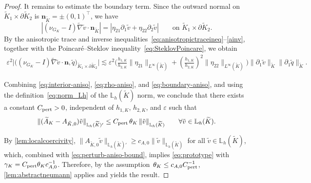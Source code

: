 \documentclass[a4paper,twoside,10pt]{article}
\newcommand{\AKO}{{A_{\tilde K,0}}}
\newcommand{\eps}{\varepsilon}
\newcommand{\IL}{\mathbb{L}}
\newcommand{\bn}{\mathbf{n}}
\numberwithin{equation}{section}
\newcommand{\Kt}{\widetilde{K}}
\newcommand{\hKot}{h_{1,K}}
\newcommand{\hKtt}{h_{2,K}}
\begin{document}
\begin{proof}
	It remains to estimate the boundary term. Since the outward normal on
	$\Kt_1\times \partial\Kt_2$ is
	$\bn_{\Kt}=\pm(0,1)^\top$, we have
	\begin{equation*}
	|(\nu_{G_K}-I)\widetilde\nabla \tilde v\cdot \bn_{\Kt}|
	=
	|\eta_{21} \partial_1 \tilde v+\eta_{22} \partial_2\tilde v|
	\qquad\text{on } \Kt_1 \times \partial\Kt_2.
	\end{equation*}
	By the anisotropic trace and inverse inequalities~\eqref{eq:anisotropictraceineq}--\eqref{ainv}, together with the Poincar\'e--Steklov inequality~\eqref{eq:SteklovPoincare}, we obtain
	\begin{align}
	\label{eq:boundary-aniso}
	\eps^2\bigl|\big( (\nu_{G_K}-I)\widetilde\nabla \tilde v\cdot \bn, \tilde q\big)_{\Kt_1\times \partial\Kt_2}\bigr|
	\lesssim
	\eps^2
	\Bigg(
	    \frac{\hKot}{\hKtt}\|\eta_{21}\|_{L^\infty(\Kt)}
	    +\left(\frac{\hKot}{\hKtt}\right)^2\|\eta_{22}\|_{L^\infty(\Kt)}
	\Bigg)
	\|\partial_1\tilde v\|_{\Kt}
	\|\partial_1 \tilde q\|_{\Kt}.
	\end{align}
	
	Combining \eqref{eq:interior-aniso}, \eqref{eq:rho-aniso}, and \eqref{eq:boundary-aniso},
	and using the definition~\eqref{eq:norm_Lh} of the $\IL_h(\Kt)$ norm, we conclude that there exists a constant $C_{\rm pert}>0$, independent of  $\hKot$, $\hKtt$, and $\eps$ such that
	\begin{equation}\label{eq:perturb-aniso-bound}
	\|(\widetilde A_K-\AKO)\tilde v\|_{\mathbb L_h(\Kt)'}
	\le
	C_{\rm pert}\,\theta_K\,
	\|\tilde v\|_{\mathbb L_h(\Kt)}
	\qquad\forall \tilde v\in \mathbb L_h(\Kt).
	\end{equation}
	
	By \cref{lem:localcoercivity}, 
	$ \|\AKO \tilde v\|_{\mathbb L_h(\Kt)'} \ge c_{A,0}\|\tilde v\|_{\mathbb L_h(\Kt)}$ for all $\tilde v\in\mathbb L_h(\Kt)$,
	which, combined with \eqref{eq:perturb-aniso-bound}, implies \eqref{eq:prototype} with $\gamma_K=C_{\rm pert}\theta_K c_{A,0}^{-1}$. 
	Therefore, by 
    the assumption~$\theta_K\leq c_{A,0} C_{\rm pert}^{-1}$, 
	\cref{lem:abstractneumann} applies and yields the result.
	\end{proof}
\end{document}
